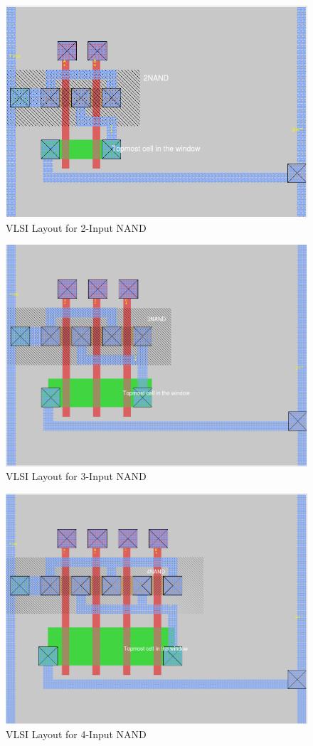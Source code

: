 \documentclass[12pt]{article}
\begin{document}
\begin{figure}[H]
	\centering
	\includegraphics[width=0.70\linewidth, keepaspectratio]{Graphics/2NAND}
	\caption{VLSI Layout for 2-Input NAND}
	\label{fig:magic_NAND2}
\end{figure}

\begin{figure}[H]
	\centering
	\includegraphics[width=0.70\linewidth, keepaspectratio]{Graphics/3NAND}
	\caption{VLSI Layout for 3-Input NAND}
	\label{fig:magic_NAND3}
\end{figure}

\begin{figure}[H]
	\centering
	\includegraphics[width=0.70\linewidth, keepaspectratio]{Graphics/4NAND}
	\caption{VLSI Layout for 4-Input NAND}
	\label{fig:magic_NAND4}
\end{figure}
\end{document}
